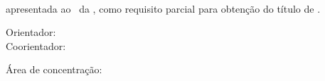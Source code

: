
\setcounter{page}{1}
	\thispagestyle{empty}
  
	\begin{center}
		\por%
	\end{center}
	
	\vfill %
	
	\begin{center}
		\textbf{\monog}\\ %
		\textbf{\subtitulo} %
	\end{center}
	
	\vfill %
	
	\begin{flushright}
		\begin{minipage}{9cm} %
			 {\tipo apresentada ao \curso~da \univ, como requisito parcial para obtenção do título de \grau.} \par %
			\vspace{1cm}
			Orientador: {\profOrientador} \\ %
			Coorientador: {\profA}
			
			\bigskip
			Área de concentração: {\areaConcentracao}

		\end{minipage}
	\end{flushright}
	
	\vfill %
	
	\begin{center}
		\cidade\\ %
		\ano %
	\end{center}
	
	\newpage %


%
%
%  
